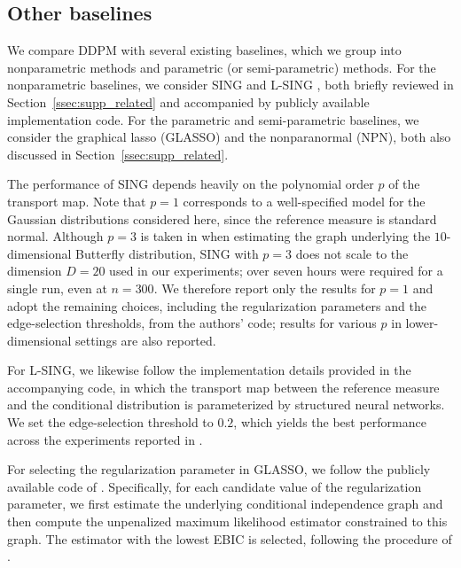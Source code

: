 \documentclass[11pt,a4paper,final]{article}
\numberwithin{equation}{section}
\theoremstyle{remark}
\begin{document}
\subsection{Other baselines} \label{ssec:supp_other}

We compare DDPM with several existing baselines, which we group into nonparametric methods and parametric (or semi-parametric) methods.
For the nonparametric baselines, we consider SING \citep{baptista2024learning} and L-SING \citep{liaw2025learning}, both briefly reviewed in Section~\ref{ssec:supp_related} and accompanied by publicly available implementation code.
For the parametric and semi-parametric baselines, we consider the graphical lasso (GLASSO) and the nonparanormal (NPN), both also discussed in Section~\ref{ssec:supp_related}.

The performance of SING depends heavily on the polynomial order $p$ of the transport map.
Note that $p = 1$ corresponds to a well-specified model for the Gaussian distributions considered here, since the reference measure is standard normal.
Although $p = 3$ is taken in \cite{baptista2024learning} when estimating the graph underlying the $10$-dimensional Butterfly distribution, SING with $p = 3$ does not scale to the dimension $D = 20$ used in our experiments; over seven hours were required for a single run, even at $n = 300$.
We therefore report only the results for $p = 1$ and adopt the remaining choices, including the regularization parameters and the edge-selection thresholds, from the authors' code; results for various $p$ in lower-dimensional settings are also reported.

For L-SING, we likewise follow the implementation details provided in the accompanying code, in which the transport map between the reference measure and the conditional distribution is parameterized by structured neural networks.
We set the edge-selection threshold to $0.2$, which yields the best performance across the experiments reported in \cite{liaw2025learning}.



For selecting the regularization parameter in GLASSO, we follow the publicly available code of \cite{lyu2024inconsistency}.
Specifically, for each candidate value of the regularization parameter, we first estimate the underlying conditional independence graph and then compute the unpenalized maximum likelihood estimator constrained to this graph.
The estimator with the lowest EBIC is selected, following the procedure of \cite{foygel2010extended}.
\end{document}

